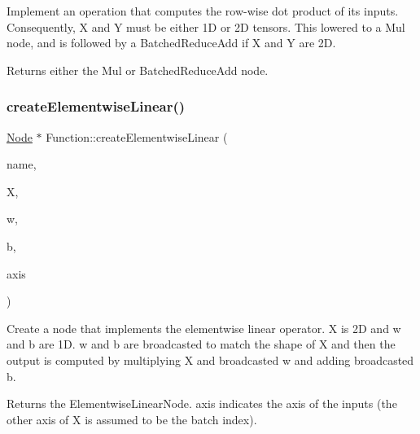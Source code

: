 Implement an operation that computes the row-\/wise dot product of its inputs. Consequently, {\ttfamily X} and {\ttfamily Y} must be either 1D or 2D tensors. This lowered to a Mul node, and is followed by a Batched\+Reduce\+Add if {\ttfamily X} and {\ttfamily Y} are 2D. \begin{DoxyReturn}{Returns}
either the Mul or Batched\+Reduce\+Add node. 
\end{DoxyReturn}
\mbox{\label{classglow_1_1_function_aefc00c1542599ab75332a236d1aee6a3}} 
\subsubsection{\texorpdfstring{create\+Elementwise\+Linear()}{createElementwiseLinear()}}
{\footnotesize\ttfamily \hyperlink{classglow_1_1_node}{Node} $\ast$ Function\+::create\+Elementwise\+Linear (\begin{DoxyParamCaption}\item[{llvm\+::\+String\+Ref}]{name,  }\item[{\hyperlink{structglow_1_1_node_value}{Node\+Value}}]{X,  }\item[{\hyperlink{structglow_1_1_node_value}{Node\+Value}}]{w,  }\item[{\hyperlink{structglow_1_1_node_value}{Node\+Value}}]{b,  }\item[{unsigned}]{axis }\end{DoxyParamCaption})}

Create a node that implements the elementwise linear operator. {\ttfamily X} is 2D and {\ttfamily w} and {\ttfamily b} are 1D. {\ttfamily w} and {\ttfamily b} are broadcasted to match the shape of {\ttfamily X} and then the output is computed by multiplying {\ttfamily X} and broadcasted {\ttfamily w} and adding broadcasted {\ttfamily b}. \begin{DoxyReturn}{Returns}
the Elementwise\+Linear\+Node. {\ttfamily axis} indicates the axis of the inputs (the other axis of {\ttfamily X} is assumed to be the batch index). 
\end{DoxyReturn}
\mbox{\label{classglow_1_1_function_af32483c4b5aff8743513d9eeec6d26fe}} 
